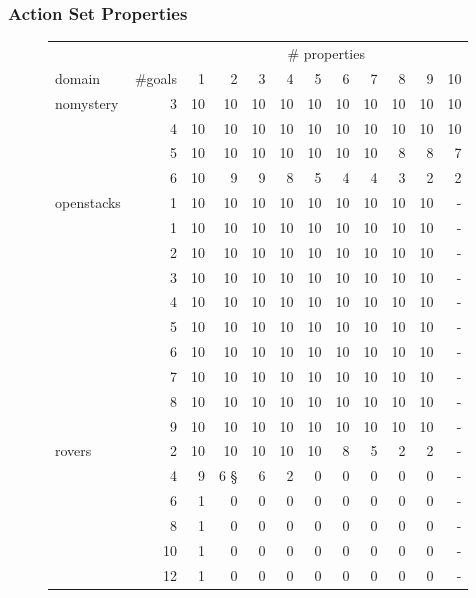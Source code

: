 \subsubsection*{Action Set Properties}

\begin{figure}[ht]
	\begin{tabular}{l|r|rrrrrrrrrr}
		& & \multicolumn{10}{c}{\# properties} \\
		domain & \#goals & 1 & 2 & 3 & 4 & 5 & 6 & 7 & 8 & 9 & 10 \\\hline
		nomystery & 3 & 10 & 10 & 10 & 10 & 10 & 10 & 10 & 10 & 10 & 10\\\hline
				& 4 & 10 & 10 & 10 & 10 & 10 & 10 & 10 & 10 & 10 & 10\\\hline
				& 5 & 10 & 10 & 10 & 10 & 10 & 10 & 10 & 8 & 8 & 7\\\hline
				& 6 & 10 & 9 & 9 & 8 & 5 & 4 & 4 & 3 & 2 & 2\\\hline\hline
		openstacks & 1 & 10 & 10 & 10 & 10 & 10 & 10 & 10 & 10 & 10 & - \\\hline
				& 1 & 10 & 10 & 10 & 10 & 10 & 10 & 10 & 10 & 10 & - \\\hline
				& 2 & 10 & 10 & 10 & 10 & 10 & 10 & 10 & 10 & 10 & - \\\hline
				& 3 & 10 & 10 & 10 & 10 & 10 & 10 & 10 & 10 & 10 & - \\\hline
				& 4 & 10 & 10 & 10 & 10 & 10 & 10 & 10 & 10 & 10 & - \\\hline
				& 5 & 10 & 10 & 10 & 10 & 10 & 10 & 10 & 10 & 10 & - \\\hline
				& 6 & 10 & 10 & 10 & 10 & 10 & 10 & 10 & 10 & 10 & - \\\hline
				& 7 & 10 & 10 & 10 & 10 & 10 & 10 & 10 & 10 & 10 & - \\\hline
				& 8 & 10 & 10 & 10 & 10 & 10 & 10 & 10 & 10 & 10 & - \\\hline
				& 9 & 10 & 10 & 10 & 10 & 10 & 10 & 10 & 10 & 10 & - \\\hline\hline
		rovers & 2 & 10 & 10 & 10 & 10 & 10 & 8 & 5 & 2 & 2 &- \\\hline
				& 4 & 9 & 6 § & 6 & 2 & 0 & 0 & 0 & 0 & 0 & - \\\hline
				& 6 & 1 & 0 & 0 & 0 & 0 & 0 & 0 & 0 & 0 & - \\\hline 
				& 8 & 1 & 0 & 0 & 0 & 0 & 0 & 0 & 0 & 0 & - \\\hline 
				& 10 & 1 & 0 & 0 & 0 & 0 & 0 & 0 & 0 & 0 & - \\\hline 
				& 12 & 1 & 0 & 0 & 0 & 0 & 0 & 0 & 0 & 0 & - \\\hline 

\end{tabular}
\end{figure}
